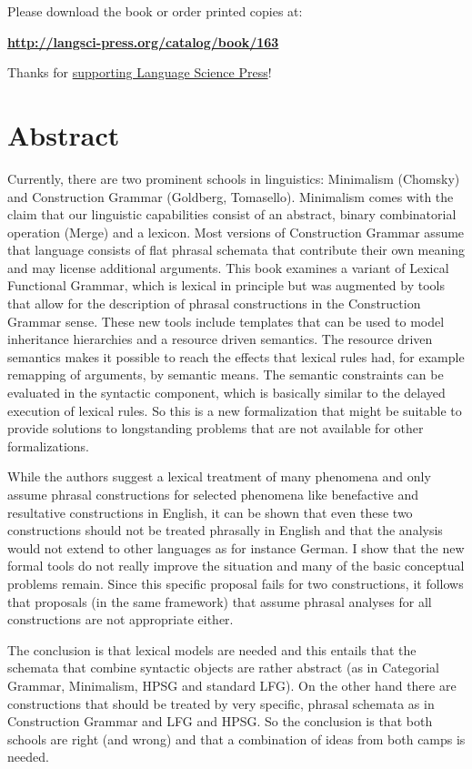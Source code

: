 \documentclass{article}
\begin{document}
Please download the book or order printed copies at:

\bigskip

\textbf{\url{http://langsci-press.org/catalog/book/163}}

\bigskip

Thanks for \href{http://langsci-press.org/about/support}{supporting Language Science Press}!

\section*{Abstract}



Currently, there are two prominent schools in linguistics: Minimalism (Chomsky) and Construction Grammar (Goldberg, Tomasello). Minimalism comes with the claim that our linguistic capabilities consist of an abstract, binary combinatorial operation (Merge) and a lexicon. Most versions of Construction Grammar assume that language consists of flat phrasal schemata that contribute their own meaning and may license additional arguments. This book examines a variant of Lexical Functional Grammar, which is lexical in principle but was augmented by tools that allow for the description of phrasal constructions in the Construction Grammar sense. These new tools include templates that can be used to model inheritance hierarchies and a resource driven semantics. The resource driven semantics makes it possible to reach the effects that lexical rules had, for example remapping of arguments, by semantic means. The semantic constraints can be evaluated in the syntactic component, which is basically similar to the delayed execution of lexical rules. So this is a new formalization that might be suitable to provide solutions to longstanding problems that are not available for other formalizations.

While the authors suggest a lexical treatment of many phenomena and only assume phrasal constructions for selected phenomena like benefactive and resultative constructions in English, it can be shown that even these two constructions should not be treated phrasally in English and that the analysis would not extend to other languages as for instance German. I show that the new formal tools do not really improve the situation and many of the basic conceptual problems remain. Since this specific proposal fails for two constructions, it follows that proposals (in the same framework) that assume phrasal analyses for all constructions are not appropriate either.

The conclusion is that lexical models are needed and this entails that the schemata that combine syntactic objects are rather abstract (as in Categorial Grammar, Minimalism, HPSG and standard LFG). On the other hand there are constructions that should be treated by very specific, phrasal schemata as in Construction Grammar and LFG and HPSG. So the conclusion is that both schools are right (and wrong) and that a combination of ideas from both camps is needed.
\end{document}
